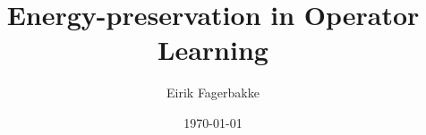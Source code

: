 \documentclass[
	fontsize=10pt, %
	twoside=false, %
	secnumdepth=1, %
]{kaobook}
\begin{document}



\titlehead{Specialization Project}
\title[Energy-preservation in Operator Learning]{Energy-preservation in Operator Learning}
\author[EF]{Eirik Fagerbakke}
\date{\today}


\frontmatter %




\begingroup %

\setlength{\textheight}{230\vscale} %

\etocstandarddisplaystyle %
\etocstandardlines %

\tableofcontents %

\listoffigures %

\let\cleardoublepage\bigskip
\let\clearpage\bigskip

\listoftables %

\endgroup
\end{document}
